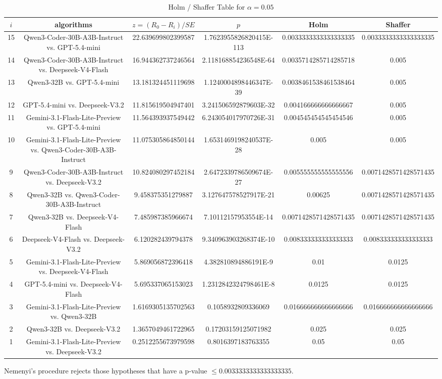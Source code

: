 \documentclass[a4paper,10pt]{article}
\begin{document}
\begin{landscape}
\begin{table}[!htp]
\centering\tiny
\caption{Holm / Shaffer Table for $\alpha=0.05$}
\begin{tabular}{cccccc}
$i$&algorithms&$z=(R_0 - R_i)/SE$&$p$&Holm&Shaffer\\
\hline
15&Qwen3-Coder-30B-A3B-Instruct vs. GPT-5.4-mini&22.639699802399587&1.7623955826820415E-113&0.0033333333333333335&0.0033333333333333335\\14&Qwen3-Coder-30B-A3B-Instruct vs. Deepseek-V4-Flash&16.944362737246564&2.118168854236548E-64&0.0035714285714285718&0.005\\13&Qwen3-32B vs. GPT-5.4-mini&13.181324451119698&1.1240004898446347E-39&0.0038461538461538464&0.005\\12&GPT-5.4-mini vs. Deepseek-V3.2&11.815619504947401&3.241506592879603E-32&0.004166666666666667&0.005\\11&Gemini-3.1-Flash-Lite-Preview vs. GPT-5.4-mini&11.564393937549442&6.243054017970726E-31&0.004545454545454546&0.005\\10&Gemini-3.1-Flash-Lite-Preview vs. Qwen3-Coder-30B-A3B-Instruct&11.075305864850144&1.6531469198240537E-28&0.005&0.005\\9&Qwen3-Coder-30B-A3B-Instruct vs. Deepseek-V3.2&10.824080297452184&2.6472339786509674E-27&0.005555555555555556&0.0071428571428571435\\8&Qwen3-32B vs. Qwen3-Coder-30B-A3B-Instruct&9.458375351279887&3.127647578527917E-21&0.00625&0.0071428571428571435\\7&Qwen3-32B vs. Deepseek-V4-Flash&7.485987385966674&7.10112157953554E-14&0.0071428571428571435&0.0071428571428571435\\6&Deepseek-V4-Flash vs. Deepseek-V3.2&6.120282439794378&9.340963903268374E-10&0.008333333333333333&0.008333333333333333\\5&Gemini-3.1-Flash-Lite-Preview vs. Deepseek-V4-Flash&5.869056872396418&4.382810894886191E-9&0.01&0.0125\\4&GPT-5.4-mini vs. Deepseek-V4-Flash&5.695337065153023&1.2312842324798461E-8&0.0125&0.0125\\3&Gemini-3.1-Flash-Lite-Preview vs. Qwen3-32B&1.6169305135702563&0.1058932809336069&0.016666666666666666&0.016666666666666666\\2&Qwen3-32B vs. Deepseek-V3.2&1.3657049461722965&0.17203159125071982&0.025&0.025\\1&Gemini-3.1-Flash-Lite-Preview vs. Deepseek-V3.2&0.2512255673979598&0.8016397183763355&0.05&0.05\\\hline
\end{tabular}
\end{table}
Nemenyi's procedure rejects those hypotheses that have a p-value $\le0.0033333333333333335$.



\end{landscape}
\end{document}
